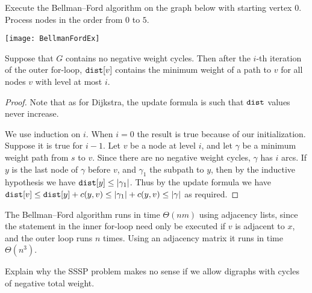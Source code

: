 \begin{Boxample}[0]
Execute the Bellman--Ford algorithm on the graph below with starting vertex $0$.
Process nodes in the order from $0$ to $5$.
\begin{center} 
  \texttt{[image: BellmanFordEx]}
\end{center}
\end{Boxample}


\begin{Theorem} 
Suppose that $G$ contains no negative weight cycles. Then after the $i$-th 
iteration of the outer for-loop, $\operatorname{\text{\texttt{dist}}}[v]$ contains the minimum weight of a 
path to $v$ for all nodes $v$ with level at most $i$.
\end{Theorem}
\begin{proof} 
Note that as for Dijkstra, the update formula is such that $\operatorname{\text{\texttt{dist}}}$ values never increase.

We use induction on $i$. When $i=0$ the result is true because of our
initialization. Suppose it is true for $i-1$. Let $v$ be a node at level
$i$, and let $\gamma$ be a minimum weight path from $s$ to $v$. Since
there are no negative weight cycles, $\gamma$ has $i$ arcs. If $y$
is the last node of $\gamma$ before $v$, and $\gamma_1$ the subpath to
$y$, then by the inductive hypothesis we have $\operatorname{\text{\texttt{dist}}}[y] \leq | \gamma_1
|$. Thus by the update formula we have $\operatorname{\text{\texttt{dist}}}[v] \leq \operatorname{\text{\texttt{dist}}}[y] + c(y, v)
\leq | \gamma_1 | + c(y, v) \leq | \gamma |$ as required.
\end{proof}

The Bellman--Ford algorithm runs in time $\Theta(nm)$ using adjacency
lists, since the statement in the inner for-loop need only be
executed if $v$ is adjacent to $x$, and the outer loop runs $n$
times. Using an adjacency matrix it runs in time $\Theta(n^3)$.

\begin{Boxample}[2] \label{ex:SSSP-neg-cycle}
Explain why the SSSP problem makes no sense if we allow digraphs with
cycles of negative total weight.
\end{Boxample}


